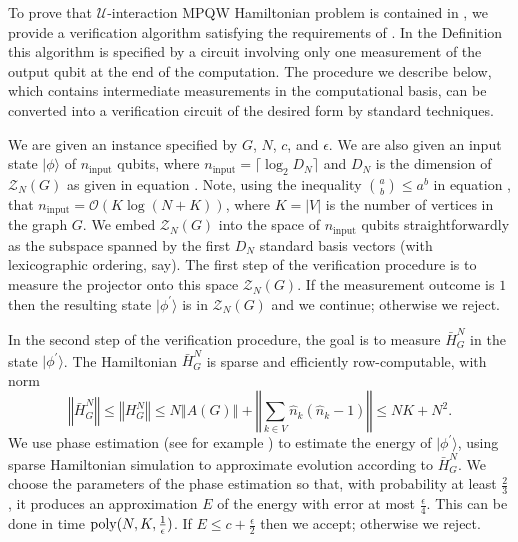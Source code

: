 \documentclass[../thesis-main/thesis-main]{subfiles}
\begin{document}
To prove that $\mathcal{U}$-interaction MPQW Hamiltonian problem is contained in \QMA, we provide a verification algorithm satisfying the requirements of . In the Definition this algorithm is specified by a circuit involving only one measurement of the output qubit at the end of the computation. The procedure we describe below, which contains intermediate measurements in the computational basis, can be converted into a verification circuit of the desired form by standard techniques.

We are given an instance specified by $G$, $N$, $c$, and $\epsilon$. We are also given an input state $|\phi\rangle$ of $n_{\text{input}}$ qubits, where $n_{\text{input}}=\lceil \log_{2}D_{N}\rceil $ and $D_{N}$ is the dimension of $\mathcal{Z}_{N}(G)$ as given in equation . Note, using the inequality $\binom{a}{b} \leq a^{b}$ in equation , that $n_{\text{input}}=\mathcal{O}(K\log\left(N+K\right))$, where $K=|V|$ is the number of vertices in the graph $G$. We embed $\mathcal{Z}_{N}(G)$ into the space of $n_{\text{input}}$ qubits straightforwardly as the subspace spanned by the first $D_{N}$ standard basis vectors (with lexicographic ordering, say). The first step of the verification procedure is to measure the projector onto this space $\mathcal{Z}_{N}(G)$. If the measurement outcome is $1$ then the resulting state $|\phi^{\prime}\rangle$ is in $\mathcal{Z}_{N}(G)$ and we continue; otherwise we reject.

In the second step of the verification procedure, the goal is to measure $\bar{H}_{G}^{N}$ in the state $|\phi^{\prime}\rangle$. The Hamiltonian $\bar{H}_{G}^{N}$ is sparse and efficiently row-computable, with norm
\begin{equation}
\left\Vert \bar{H}_{G}^{N}\right\Vert \leq\left\Vert H_{G}^{N}\right\Vert \leq N\left\Vert A(G)\right\Vert +\left\Vert \sum_{k\in V}\hat{n}_{k}\left(\hat{n}_{k}-1\right)\right\Vert \leq NK+N^{2}.
\end{equation}
We use phase estimation (see for example \cite{CEMM98}) to estimate the energy of $|\phi^{\prime}\rangle$, using sparse Hamiltonian simulation \cite{AT03} to approximate evolution according to $\bar{H}_{G}^{N}$. We choose the parameters of the phase estimation so that, with probability at least $\frac{2}{3}$, it produces an approximation $E$ of the energy with error at most $\frac{\epsilon}{4}$. This can be done in time $\operatorname{poly}(N,K,\frac{1}{\epsilon})$. If $E\leq c+\frac{\epsilon}{2}$ then we accept; otherwise we reject.
\end{document}
